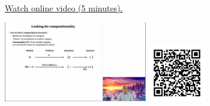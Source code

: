 
\begin{minipage}{10cm}
    \href{https://act4e-spring21.netlify.app/videos/spring2021-functorial-comp-a:compositionality.html}{Watch online video (5 minutes).}
        
    \href{https://act4e-spring21.netlify.app/videos/spring2021-functorial-comp-a:compositionality.html}{\includegraphics[height=3.5cm]{spring2021-functorial-comp-a:compositionality/thumbnails.jpg}}
    \href{https://act4e-spring21.netlify.app/videos/spring2021-functorial-comp-a:compositionality.html}{\includegraphics[height=2.5cm]{spring2021-functorial-comp-a:compositionality/qrcode.png}}
\end{minipage}
